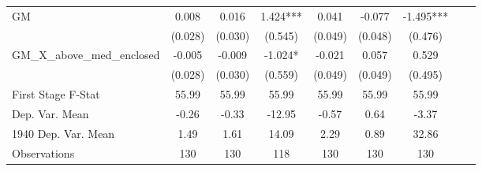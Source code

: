 \begin{tabular}{l*{8}{c}}
\cmidrule(lr){1-7}
GM              &    0.008   &    0.016   &    1.424***&    0.041   &   -0.077   &   -1.495***\\
                &  (0.028)   &  (0.030)   &  (0.545)   &  (0.049)   &  (0.048)   &  (0.476)   \\
\addlinespace
GM\_X\_above\_med\_enclosed&   -0.005   &   -0.009   &   -1.024*  &   -0.021   &    0.057   &    0.529   \\
                &  (0.028)   &  (0.030)   &  (0.559)   &  (0.049)   &  (0.049)   &  (0.495)   \\
\midrule
First Stage F-Stat&    55.99   &    55.99   &    55.99   &    55.99   &    55.99   &    55.99   \\
Dep. Var. Mean  &    -0.26   &    -0.33   &   -12.95   &    -0.57   &     0.64   &    -3.37   \\
1940 Dep. Var. Mean&     1.49   &     1.61   &    14.09   &     2.29   &     0.89   &    32.86   \\
Observations    &      130   &      130   &      118   &      130   &      130   &      130   \\
 \bottomrule \end{tabular}
